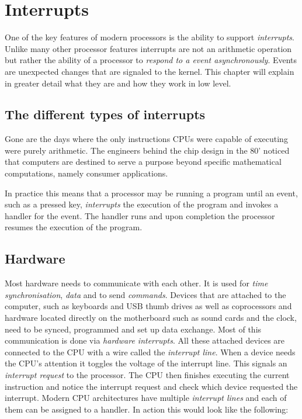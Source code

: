 \section{Interrupts}

One of the key features of modern processors is the ability to support \textit{interrupts}.
Unlike many other processor features interrupts are not an arithmetic operation but
rather the ability of a processor to \textit{respond to a event asynchronously}. Events are
unexpected changes that are signaled to the kernel. This chapter will explain in
greater detail what they are and how they work in low level.

\subsection{The different types of interrupts}

Gone are the days where the only instructions CPUs were capable of executing were
purely arithmetic. The engineers behind the chip design in the 80' noticed that
computers are destined to serve a purpose beyond specific mathematical computations,
namely consumer applications.

In
practice this means that a processor may be running a program until an event, such as a pressed
key, \textit{interrupts} the execution of the program and invokes a handler for the event. The
handler runs and upon completion the processor resumes the execution of the program.

\subsection{Hardware}

Most hardware needs to communicate with each other. It is used for \textit{time synchronisation},
\textit{data} and to send \textit{commands}. Devices that are attached to the computer, such as keyboards 
and USB thumb drives as well as coprocessors and hardware located directly on the 
motherboard such as sound cards and the clock, need to be synced, programmed and set up data
exchange. Most of this communication is done via \textit{hardware interrupts}. All these attached
devices are connected to the CPU with a wire called the \textit{interrupt line}. When a device needs the CPU's 
attention it toggles the voltage of the interrupt line. This signals an \textit{interrupt request} to the
processor. The CPU then finishes executing the current instruction and notice the interrupt request and
check which device requested the interrupt. Modern CPU architectures have multiple \textit{interrupt lines}
and each of them can be assigned to a handler. In action this would look like the following:

